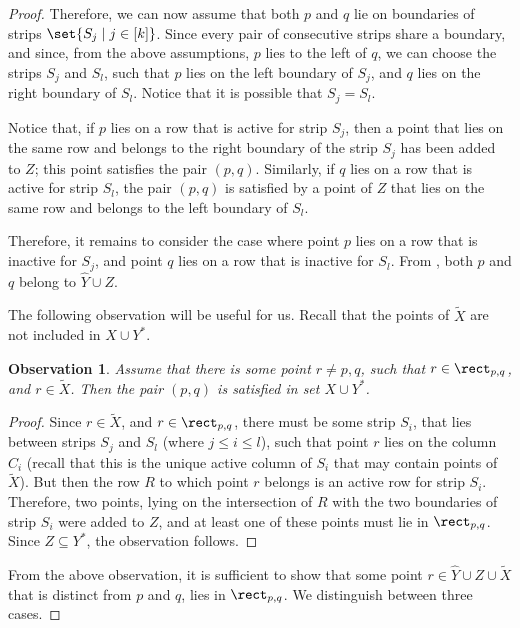 \documentclass{toc}
\newtheorem{myobs}[theorem]{Observation}
\begin{document}
\begin{proof}
Therefore, we can now assume that both $p$ and $q$ lie on boundaries of strips $\set{S_j \mid j \in [k]}$. Since every pair of consecutive strips share a boundary, and since, from the above assumptions, $p$ lies to the left of $q$, we can choose the strips $S_j$ and $S_{l}$, such that $p$ lies on the left boundary of $S_j$, and $q$ lies on the right boundary of $S_{l}$. Notice that it is possible that $S_j=S_{l}$.

Notice that, if $p$ lies on a row that is active for strip $S_j$, then a point that lies on the same row and belongs to the right boundary of the strip $S_j$ has been added to $Z$; this point satisfies the pair $(p,q)$. Similarly, if $q$ lies on a row that is active for strip $S_{l}$, the pair $(p,q)$ is satisfied by a point of $Z$ that lies on the same row and belongs to the left boundary of $S_{l}$.

Therefore, it remains to consider the case where point $p$ lies on a row that is inactive for $S_j$, and point $q$ lies on a row that is inactive for $S_{l}$. From , both $p$ and $q$ belong to $\hat Y\cup Z$.

The following observation will be useful for us. Recall that the points of $\widetilde{X}$ are not included in $X\cup Y^*$.

\begin{myobs}\label{obs: satisfied by Xc}
	Assume that there is some point $r\neq p,q$, such that $r\in \rect_{p,q}$, and $r\in \widetilde{X}$. Then the pair $(p,q)$ is satisfied in set $X\cup Y^*$.
	\end{myobs}
\begin{proof}
	Since $r\in \widetilde{X}$, and $r\in \rect_{p,q}$, there must be some strip $S_i$, that lies between strips $S_j$ and $S_{l}$ (where $j \leq i \leq l$), such that point $r$ lies on the column $C_i$ (recall that this is the unique active column of $S_i$ that may contain points of $\widetilde{X}$). But then the row $R$ to which point $r$ belongs is an active row for strip $S_i$. Therefore, two  points, lying on the intersection of $R$ with the two boundaries of strip $S_i$ were added to $Z$, and at least one of these points must lie in $\rect_{p,q}$. Since $Z\subseteq Y^*$, the observation follows.
\end{proof}



From the above observation, it is sufficient to show that some point $r\in \hat Y\cup Z\cup \widetilde{X}$ that is distinct from $p$ and $q$, lies in $\rect_{p,q}$.
We distinguish between three cases.


\end{proof}
\end{document}
